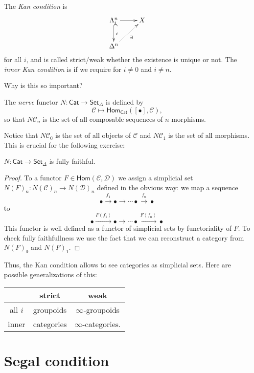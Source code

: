 The {\it Kan condition} is
$$
\xymatrix{
\Lambda^n_i\ar@{^{(}->}[d]^i \ar[r]&  X\\
\Delta^n\ar@{.>}[ur]_{\exists }
}
$$
for all $i$, 
and is called strict/weak whether the existence
is unique or not. The {\it inner Kan condition} 
is if we require for $i \neq 0$ and $i\neq n$.

Why is this so important?

\begin{definition}
\label{definition-nerve}
The {\it nerve} functor $N:\mathsf{Cat} \to \mathsf{Set}_\Delta$ 
is defined by
$$
\mathcal{C} \mapsto  \mathsf{Hom}_{\mathsf{Cat}}([\bullet],\mathcal{C}),
$$
so that $N\mathcal{C}_n$ is the set
of all composable sequences of $n$ morphisms.
\end{definition}

Notice that $N\mathcal{C}_0$ is the set of all objects of $\mathcal{C}$ 
and $N\mathcal{C}_1$ is the set of all morphisms.
This is crucial for the following exercise:

\begin{exercise}
\label{exercise-}
$N:\mathsf{Cat}\to\mathsf{Set}_\Delta$ is fully faithful.
\end{exercise}

\begin{proof}
To a functor $F \in \mathsf{Hom}(\mathcal{C},\mathcal{D})$ 
we assign a simplicial set $N(F)_n:N(\mathcal{C})_n \to N(\mathcal{D})_n$ 
defined in the obvious way: we map a sequence
$$
\bullet \xrightarrow{f_1}\bullet\to \cdots \bullet \xrightarrow{f_n}\bullet
$$
to
$$
\bullet \xrightarrow{F(f_1)}\bullet \to \cdots
\bullet\xrightarrow{F(f_n)}\bullet
$$
This functor is well defined as a functor
of simplicial sets by functoriality of $F$.
To check fully faithfullness we use the fact
that we can reconstruct a category from 
$N(F)_0$ and $N(F)_1$.
\end{proof}

Thus, the Kan condition allows to see categories
as simplicial sets. Here are possible generalizations
of this:

\begin{center}
\begin{tabular}{c | c | c}
& strict &weak\\
\hline
all $i$ & groupoids & $\infty$-groupoids\\
inner & categories & $\infty$-categories.
\end{tabular}
\end{center}

\section{Segal condition}
\label{section-segal-condition}

